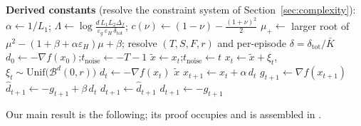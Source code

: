 \documentclass[11pt]{article}
\theoremstyle{plain}
\theoremstyle{definition}
\theoremstyle{remark}
\begin{document}
\begin{algorithm}[t]
\caption{PR-CMOM: Perturbed Restarted Constant Momentum
$\mathrm{PR\text{-}CMOM}(x_0,\,L_1,L_2,\,\varepsilon_g,\varepsilon_H,\,\beta,\,\nu,\,\delta_{\mathrm{tot}},\,\Delta_f)$}
\label{alg:prncg}
\begin{algorithmic}[1]
\State \textbf{Derived constants} (resolve the constraint system of Section~\ref{sec:complexity}):
\Statex \quad $\alpha \gets 1/L_1$;\quad
        $\Lambda \gets \log\!\frac{d\, L_1 L_2 \Delta_f}{\varepsilon_g\,\varepsilon_H\,\delta_{\mathrm{tot}}}$;\quad
        $c(\nu)\gets (1-\nu)-\tfrac{(1+\nu)^2}{2}$
\Statex \quad $\mu_+ \gets$ larger root of $\mu^2-(1+\beta+\alpha\varepsilon_H)\mu+\beta$;\quad
        resolve $(T,S,F,r)$ and per-episode $\delta=\delta_{\mathrm{tot}}/\bar K$
\State $d_0 \gets -\nabla f(x_0)$;\quad $t_{\mathrm{noise}} \gets -T-1$
        \State $\tilde{x} \gets x_t$;\quad $t_{\mathrm{noise}} \gets t$
        \State $x_t \gets \tilde{x} + \xi_t$,\quad $\xi_t \sim \mathrm{Unif}\big(\mathcal{B}^d(0,r)\big)$
        \State $d_t \gets -\nabla f(x_t)$
    \EndIf
        \State \Return $\tilde{x}$
    \EndIf
    \State $x_{t+1} \gets x_t + \alpha\, d_t$
    \State $g_{t+1} \gets \nabla f(x_{t+1})$
    \State $\hat{d}_{t+1} \gets -g_{t+1} + \beta\, d_t$
        \State $d_{t+1} \gets \hat{d}_{t+1}$
    \Else
        \State $d_{t+1} \gets -g_{t+1}$
    \EndIf
\EndFor
\end{algorithmic}
\end{algorithm}

Our main result is the following; its proof occupies
and is assembled in .
\end{document}
